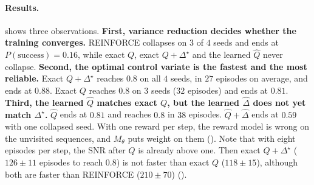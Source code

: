 \documentclass[10pt]{article}
\theoremstyle{plain}
\theoremstyle{definition}
\theoremstyle{remark}
\theoremstyle{definition}
\newcommand{\Dstar}{\Delta^{\star}}
\begin{document}
\paragraph{Results.}  shows three observations. \textbf{First, variance reduction decides whether the training converges.} REINFORCE collapses on $3$ of $4$ seeds and ends at $P(\text{success})=0.16$, while exact $Q$, exact $Q{+}\Dstar$ and the learned $\hat Q$ never collapse. \textbf{Second, the optimal control variate is the fastest and the most reliable.} Exact $Q{+}\Dstar$ reaches $0.8$ on all $4$ seeds, in $27$ episodes on average, and ends at $0.88$. Exact $Q$ reaches $0.8$ on $3$ seeds ($32$ episodes) and ends at $0.81$. \textbf{Third, the learned $\hat Q$ matches exact $Q$, but the learned $\hat\Delta$ does not yet match $\Dstar$.} $\hat Q$ ends at $0.81$ and reaches $0.8$ in $38$ episodes. $\hat Q{+}\hat\Delta$ ends at $0.59$ with one collapsed seed. With one reward per step, the reward model is wrong on the unvisited sequences, and $M_\theta$ puts weight on them (). Note that with eight episodes per step, the SNR after $Q$ is already above one. Then exact $Q{+}\Dstar$ ($126\pm11$ episodes to reach $0.8$) is not faster than exact $Q$ ($118\pm15$), although both are faster than REINFORCE ($210\pm70$) ().
\end{document}
